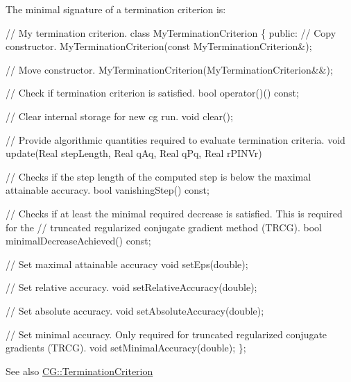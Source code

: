 \label{group__CGConceptGroup_ga6b30d103c365816efcfb038d922aef07_CG_TerminationCriterionConceptAnchor}%
\hypertarget{group__CGConceptGroup_ga6b30d103c365816efcfb038d922aef07_CG_TerminationCriterionConceptAnchor}{}%
The minimal signature of a termination criterion is\+: 
\begin{DoxyCode}
\textcolor{comment}{// My termination criterion.}
\textcolor{keyword}{class }MyTerminationCriterion
\{
\textcolor{keyword}{public}:
  \textcolor{comment}{// Copy constructor.}
  MyTerminationCriterion(\textcolor{keyword}{const} MyTerminationCriterion&);

  \textcolor{comment}{// Move constructor.}
  MyTerminationCriterion(MyTerminationCriterion&&);

  \textcolor{comment}{// Check if termination criterion is satisfied.}
  \textcolor{keywordtype}{bool} operator()() \textcolor{keyword}{const};

  \textcolor{comment}{// Clear internal storage for new cg run.}
  \textcolor{keywordtype}{void} clear();

  \textcolor{comment}{// Provide algorithmic quantities required to evaluate termination criteria.}
  \textcolor{keywordtype}{void} update(Real stepLength, Real qAq, Real qPq, Real rPINVr)

  \textcolor{comment}{// Checks if the step length of the computed step is below the maximal attainable accuracy.}
  \textcolor{keywordtype}{bool} vanishingStep() \textcolor{keyword}{const};

  \textcolor{comment}{// Checks if at least the minimal required decrease is satisfied. This is required for the}
  \textcolor{comment}{// truncated regularized conjugate gradient method (TRCG).}
  \textcolor{keywordtype}{bool} minimalDecreaseAchieved() \textcolor{keyword}{const};

  \textcolor{comment}{// Set maximal attainable accuracy}
  \textcolor{keywordtype}{void} setEps(\textcolor{keywordtype}{double});

  \textcolor{comment}{// Set relative accuracy.}
  \textcolor{keywordtype}{void} setRelativeAccuracy(\textcolor{keywordtype}{double});

  \textcolor{comment}{// Set absolute accuracy.}
  \textcolor{keywordtype}{void} setAbsoluteAccuracy(\textcolor{keywordtype}{double});

  \textcolor{comment}{// Set minimal accuracy. Only required for truncated regularized conjugate gradients (TRCG).}
  \textcolor{keywordtype}{void} setMinimalAccuracy(\textcolor{keywordtype}{double});
\};
\end{DoxyCode}


\begin{DoxySeeAlso}{See also}
\hyperlink{group__CGGroup_gaa927be31b313bb4ce635668c77b55860_CG_TerminationCriterionAnchor}{C\+G\+:\+:Termination\+Criterion} 
\end{DoxySeeAlso}
